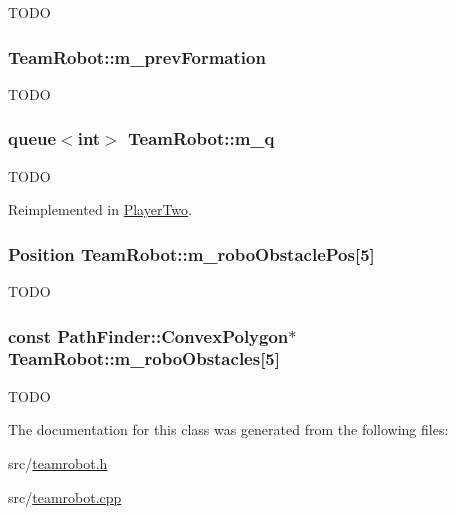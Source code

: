 \label{classTeamRobot_a155fbee5f74459799332801b09c99616}
TODO \hypertarget{classTeamRobot_ab32d14c3de4fd5a6ff6db39eb04f52f2}{
\subsubsection[{m\_\-prevFormation}]{ {\bf TeamRobot::m\_\-prevFormation}}}
\label{classTeamRobot_ab32d14c3de4fd5a6ff6db39eb04f52f2}
TODO \hypertarget{classTeamRobot_a982ed6b6964c5e8b94519ef91b52c468}{
\subsubsection[{m\_\-q}]{\setlength{\rightskip}{0pt plus 5cm}queue$<$int$>$ {\bf TeamRobot::m\_\-q}}}
\label{classTeamRobot_a982ed6b6964c5e8b94519ef91b52c468}
TODO 

Reimplemented in \hyperlink{classPlayerTwo_ac2f70709bd48ad9f5c2435cbff1e65b3}{PlayerTwo}.

\hypertarget{classTeamRobot_a5337cff2b594fd63b2445c1d49374d7e}{
\subsubsection[{m\_\-roboObstaclePos}]{\setlength{\rightskip}{0pt plus 5cm}Position {\bf TeamRobot::m\_\-roboObstaclePos}\mbox{[}5\mbox{]}}}
\label{classTeamRobot_a5337cff2b594fd63b2445c1d49374d7e}
TODO \hypertarget{classTeamRobot_a9dc410e800f251d62dbde6b3791b2009}{
\subsubsection[{m\_\-roboObstacles}]{\setlength{\rightskip}{0pt plus 5cm}const {\bf PathFinder::ConvexPolygon}$\ast$ {\bf TeamRobot::m\_\-roboObstacles}\mbox{[}5\mbox{]}}}
\label{classTeamRobot_a9dc410e800f251d62dbde6b3791b2009}
TODO 

The documentation for this class was generated from the following files:\begin{DoxyCompactItemize}
\item 
src/\hyperlink{teamrobot_8h}{teamrobot.h}\item 
src/\hyperlink{teamrobot_8cpp}{teamrobot.cpp}\end{DoxyCompactItemize}

